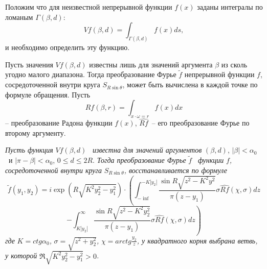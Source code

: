 Положим что для неизвестной непрерывной функции  $f(x)$ заданы интегралы по ломаным  $\Gamma \left(\beta ,d\right)$:
\begin{equation*}
\mathit{Vf}\left(\beta ,d\right)=\int _{\Gamma \left(\beta ,d\right)}^{}f(x)\mathit{ds},
\end{equation*}
и необходимо определить эту функцию.

Пусть значения $\mathit{Vf}\left(\beta ,d\right)$ известны лишь для значений
аргумента  $\beta $  из сколь угодно малого диапазона. 
Тогда преобразование Фурье $\tilde{f}$ непрерывной функции $f$, сосредоточенной внутри круга $S_{R\sin\theta}$, может быть вычислена в каждой точке по формуле обращения.
%
Пусть
\begin{equation*}
\mathit{Rf}\left(\beta ,r\right)=\int _{x{\cdot}\omega =r}^{}f(x)\mathit{dx}
\end{equation*}
-- преобразование Радона функции  $f(x)$,  $\widehat {\mathit{Rf}}$\ – его преобразование Фурье по второму аргументу.

\begin{theorem}
\textit{Пусть функция}  $\mathit{Vf}\left(\beta ,d\right)$ \ \textit{известна для значений
	аргументов}  $\left(\beta ,d\right)$, $\left|\beta \right|<\alpha _0$ \ и  $\left|\pi -\beta \right|<\alpha
_0$, $0{\leq}d{\leq}2R$. \textit{Тогда преобразование Фурье } $\widetilde f$ \textit{\ функции } $f$\textit{,
	сосредоточенной внутри круга } $S_{R\sin \theta }$\textit{, восстанавливается по формуле}
\begin{equation*}
\widetilde f\left(y_1,y_2\right)=i\exp \left(R\sqrt{K^2y_2^2-y_1^2}\right){\cdot}\left(\int_{-\inf}^{-K\left|y_2\right|}\frac{\sin R \sqrt{z^2-K^2y^2}}{\pi(z - y_1)}\sigma\widehat{Rf}(\chi, \sigma)dz\right.
\end{equation*}
\begin{equation*}
\left.-\int _{K\left|y_2^{}\right|}^{{\infty}}\frac{\sin R\sqrt{z^2-K^2y_2^2}}{\pi \left(z-y_1\right)}\sigma \widehat
{\mathit{Rf}}\left(\chi ,\sigma \right)\mathit{dz}\right)
\end{equation*}
\textit{где } $K=\mathit{ctg}\alpha _0$\textit{, } $\sigma =\sqrt{z^2+y_2^2}$\textit{,} $\chi =\mathit{arctg}\frac{y_2}
z$\textit{, у квадратного корня выбрана ветвь, у которой } $\Re \sqrt{K^2y_2^2-y_1^2}>0$\textit{.} 
\end{theorem}